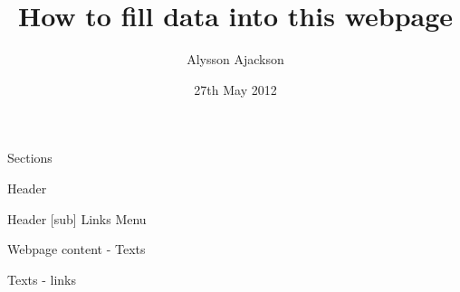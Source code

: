 \documentclass{article}
\title{How to fill data into this webpage}
\author{Alysson Ajackson}
\date{27th May 2012}
\begin{document}
\maketitle

Sections
\begin{list}{Section :~}{}
\item Header
\item Header [sub] Links Menu
\item Webpage content - Texts
\item Texts - links
\end{list}
\end{document}
